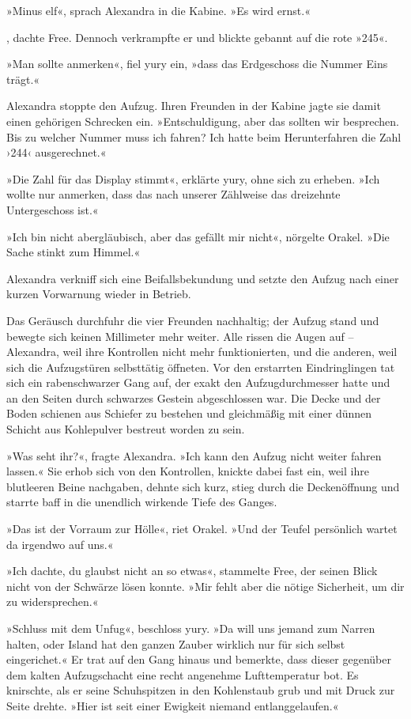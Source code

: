 »Minus elf«, sprach Alexandra in die Kabine. »Es wird ernst.«

, dachte Free. Dennoch verkrampfte er und blickte gebannt auf die rote »245«.

»Man sollte anmerken«, fiel yury ein, »dass das Erdgeschoss die Nummer Eins trägt.«

Alexandra stoppte den Aufzug. Ihren Freunden in der Kabine jagte sie damit einen gehörigen Schrecken ein. »Entschuldigung, aber das sollten wir besprechen. Bis zu welcher Nummer muss ich fahren? Ich hatte beim Herunterfahren die Zahl ›244‹ ausgerechnet.«

»Die Zahl für das Display stimmt«, erklärte yury, ohne sich zu erheben. »Ich wollte nur anmerken, dass das nach unserer Zählweise das dreizehnte Untergeschoss ist.«

»Ich bin nicht abergläubisch, aber das gefällt mir nicht«, nörgelte Orakel. »Die Sache stinkt zum Himmel.«

Alexandra verkniff sich eine Beifallsbekundung und setzte den Aufzug nach einer kurzen Vorwarnung wieder in Betrieb.


Das Geräusch durchfuhr die vier Freunden nachhaltig; der Aufzug stand und bewegte sich keinen Millimeter mehr weiter. Alle rissen die Augen auf – Alexandra, weil ihre Kontrollen nicht mehr funktionierten, und die anderen, weil sich die Aufzugstüren selbsttätig öffneten. Vor den erstarrten Eindringlingen tat sich ein rabenschwarzer Gang auf, der exakt den Aufzugdurchmesser hatte und an den Seiten durch schwarzes Gestein abgeschlossen war. Die Decke und der Boden schienen aus Schiefer zu bestehen und gleichmäßig mit einer dünnen Schicht aus Kohlepulver bestreut worden zu sein.

»Was seht ihr?«, fragte Alexandra. »Ich kann den Aufzug nicht weiter fahren lassen.« Sie erhob sich von den Kontrollen, knickte dabei fast ein, weil ihre blutleeren Beine nachgaben, dehnte sich kurz, stieg durch die Deckenöffnung und starrte baff in die unendlich wirkende Tiefe des Ganges.

»Das ist der Vorraum zur Hölle«, riet Orakel. »Und der Teufel persönlich wartet da irgendwo auf uns.«

»Ich dachte, du glaubst nicht an so etwas«, stammelte Free, der seinen Blick nicht von der Schwärze lösen konnte. »Mir fehlt aber die nötige Sicherheit, um dir zu widersprechen.«

»Schluss mit dem Unfug«, beschloss yury. »Da will uns jemand zum Narren halten, oder Island hat den ganzen Zauber wirklich nur für sich selbst eingerichet.« Er trat auf den Gang hinaus und bemerkte, dass dieser gegenüber dem kalten Aufzugschacht eine recht angenehme Lufttemperatur bot. Es knirschte, als er seine Schuhspitzen in den Kohlenstaub grub und mit Druck zur Seite drehte. »Hier ist seit einer Ewigkeit niemand entlanggelaufen.«


